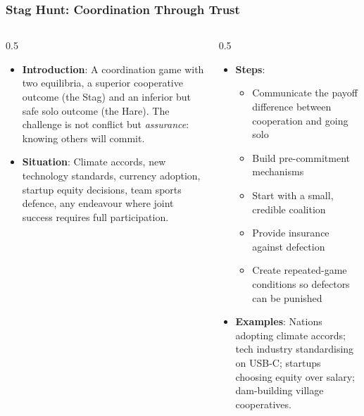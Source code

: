 \begin{frame}[fragile]\frametitle{Stag Hunt: Coordination Through Trust}
\begin{columns}
    \begin{column}[T]{0.5\linewidth}
      \begin{itemize}
        \item \textbf{Introduction}: A coordination game with two equilibria, a superior cooperative outcome (the Stag) and an inferior but safe solo outcome (the Hare). The challenge is not conflict but \textit{assurance}: knowing others will commit.
        \item \textbf{Situation}: Climate accords, new technology standards, currency adoption, startup equity decisions, team sports defence, any endeavour where joint success requires full participation.
      \end{itemize}
    \end{column}
    \begin{column}[T]{0.5\linewidth}
      \begin{itemize}
        \item \textbf{Steps}:
        \begin{itemize}
          \item Communicate the payoff difference between cooperation and going solo
          \item Build pre-commitment mechanisms
          \item Start with a small, credible coalition
          \item Provide insurance against defection
          \item Create repeated-game conditions so defectors can be punished
        \end{itemize}\item \textbf{Examples}: Nations adopting climate accords; tech industry standardising on USB-C; startups choosing equity over salary; dam-building village cooperatives.
      \end{itemize}
    \end{column}
  \end{columns}
\end{frame}

